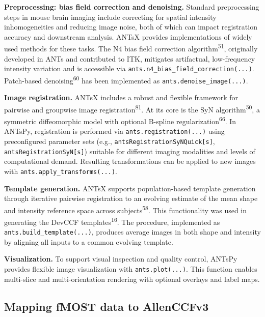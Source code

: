 \documentclass[
  12pt,
]{article}
\begin{document}


\textbf{Preprocessing: bias field correction and denoising.} Standard
preprocessing steps in mouse brain imaging include correcting for
spatial intensity inhomogeneities and reducing image noise, both of
which can impact registration accuracy and downstream analysis. ANTsX
provides implementations of widely used methods for these tasks. The N4
bias field correction algorithm\textsuperscript{51}, originally
developed in ANTs and contributed to ITK, mitigates artifactual,
low-frequency intensity variation and is accessible via
\texttt{ants.n4\_bias\_field\_correction(...)}. Patch-based
denoising\textsuperscript{60} has been implemented as
\texttt{ants.denoise\_image(...)}.

\textbf{Image registration.} ANTsX includes a robust and flexible
framework for pairwise and groupwise image
registration\textsuperscript{81}. At its core is the SyN
algorithm\textsuperscript{50}, a symmetric diffeomorphic model with
optional B-spline regularization\textsuperscript{66}. In ANTsPy,
registration is performed via \texttt{ants.registration(...)} using
preconfigured parameter sets (e.g.,
\texttt{antsRegistrationSyNQuick{[}s{]}},
\texttt{antsRegistrationSyN{[}s{]}}) suitable for different imaging
modalities and levels of computational demand. Resulting transformations
can be applied to new images with \texttt{ants.apply\_transforms(...)}.

\textbf{Template generation.} ANTsX supports population-based template
generation through iterative pairwise registration to an evolving
estimate of the mean shape and intensity reference space across
subjects\textsuperscript{58}. This functionality was used in generating
the DevCCF templates\textsuperscript{16}. The procedure, implemented as
\texttt{ants.build\_template(...)}, produces average images in both
shape and intensity by aligning all inputs to a common evolving
template.

\textbf{Visualization.} To support visual inspection and quality
control, ANTsPy provides flexible image visualization with
\texttt{ants.plot(...)}. This function enables multi-slice and
multi-orientation rendering with optional overlays and label maps.

\subsection{Mapping fMOST data to
AllenCCFv3}\label{mapping-fmost-data-to-allenccfv3}
\end{document}
